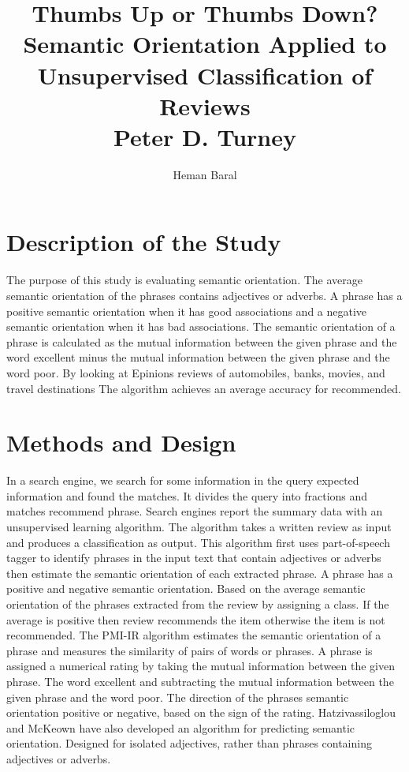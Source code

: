 \documentclass[journal, a4paper]{IEEEtran}
\begin{document}
	\title{Thumbs Up or Thumbs Down? Semantic Orientation Applied to Unsupervised Classification of Reviews\\Peter D. Turney}
	\author{Heman Baral}{}
	\maketitle
\section{Description of the Study} 

The purpose of this study is evaluating semantic orientation. The average semantic orientation of the phrases contains adjectives or adverbs. A phrase has a positive semantic orientation when it has good associations and a negative semantic orientation when it has bad associations. The semantic orientation of a phrase is calculated as the mutual information between the given phrase and the word excellent minus the mutual information between the given phrase and the word poor. By looking at Epinions reviews of automobiles, banks, movies, and travel destinations The algorithm achieves an average accuracy for recommended.


\section{Methods and Design}
	In a search engine, we search for some information in the query expected information and found the matches. It divides the query into fractions and matches recommend phrase. Search engines report the summary data with an unsupervised learning algorithm. The algorithm takes a written review as input and produces a classification as output. This algorithm first uses part-of-speech tagger to identify phrases in the input text that contain adjectives or adverbs then estimate the semantic orientation of each extracted phrase. A phrase has a positive and negative semantic orientation. Based on the average semantic orientation of the phrases extracted from the review by assigning a class. If the average is positive then review recommends the item otherwise the item is not recommended. The PMI-IR algorithm estimates the semantic orientation of a phrase and measures the similarity of pairs of words or phrases. A phrase is assigned a numerical rating by taking the mutual information between the given phrase. The word excellent and subtracting the mutual information between the given phrase and the word poor. The direction of the phrases semantic orientation positive or negative, based on the sign of the rating. Hatzivassiloglou and McKeown have also developed an algorithm for predicting semantic orientation. Designed for isolated adjectives, rather than phrases containing adjectives or adverbs.
\end{document}
